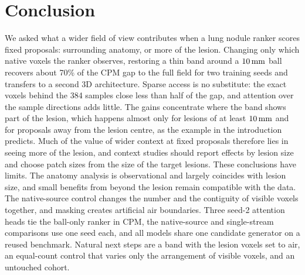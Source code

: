 \section{Conclusion}
\label{sec:discussion}
\label{sec:conclusion}
We asked what a wider field of view contributes when a lung nodule ranker scores fixed proposals: surrounding anatomy, or more of the lesion. Changing only which native voxels the ranker observes, restoring a thin band around a $10\,\mathrm{mm}$ ball recovers about 70\% of the CPM gap to the full field for two training seeds and transfers to a second 3D architecture. Sparse access is no substitute: the exact voxels behind the 384 samples close less than half of the gap, and attention over the sample directions adds little. The gains concentrate where the band shows part of the lesion, which happens almost only for lesions of at least $10\,\mathrm{mm}$ and for proposals away from the lesion centre, as the example in the introduction predicts. Much of the value of wider context at fixed proposals therefore lies in seeing more of the lesion, and context studies should report effects by lesion size and choose patch sizes from the size of the target lesions. These conclusions have limits. The anatomy analysis is observational and largely coincides with lesion size, and small benefits from beyond the lesion remain compatible with the data. The native-source control changes the number and the contiguity of visible voxels together, and masking creates artificial air boundaries. Three seed-2 attention heads tie the ball-only ranker in CPM, the native-source and single-stream comparisons use one seed each, and all models share one candidate generator on a reused benchmark. Natural next steps are a band with the lesion voxels set to air, an equal-count control that varies only the arrangement of visible voxels, and an untouched cohort.
